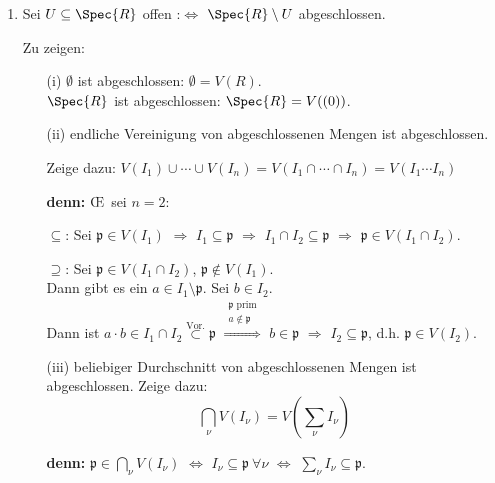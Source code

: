 \begin{Bew}
\begin{enumerate}
\item Sei $U \subseteq \Spec{R}$ offen :$\Leftrightarrow$ $\Spec{R} \setminus U$
abgeschlossen.

Zu zeigen:
\begin{enumerate}
\item[(i)] $\emptyset$ ist abgeschlossen: $\emptyset = V(R)$.\\
$\Spec{R}$ ist abgeschlossen: $\Spec{R} = V( (0) )$.

\item[(ii)] endliche Vereinigung von abgeschlossenen Mengen ist abgeschlossen.

Zeige dazu: $V(I_1) \cup \cdots \cup V(I_n) = V(I_1 \cap \cdots \cap I_n) = V(I_1 \cdots I_n)$

\textbf{denn:} \OE\ sei $n=2$:

\glqq$\subseteq$\grqq: Sei $\mathfrak{p} \in V(I_1)$ $\Rightarrow$ $I_1 \subseteq \mathfrak{p}$ $\Rightarrow$ $I_1 \cap I_2 \subseteq \mathfrak{p}$ $\Rightarrow$ $\mathfrak{p} \in V(I_1 \cap I_2)$.

\glqq$\supseteq$\grqq: Sei $\mathfrak{p} \in V(I_1 \cap I_2)$, $\mathfrak{p} \not\in V(I_1)$.\\
Dann gibt es ein $a \in I_1 \setminus \mathfrak{p}$. Sei $b \in I_2$.\\
Dann ist $a \cdot b \in I_1 \cap I_2 \overset{\text{Vor.}}{\subset} \mathfrak{p}$ $\overset{\substack{\mathfrak{p}\text{ prim} \\ a \notin \mathfrak{p}}}{\Rightarrow}$ $b \in \mathfrak{p}$ $\Rightarrow$ $I_2 \subseteq \mathfrak{p}$, d.h. $\mathfrak{p} \in V(I_2)$.

\item[(iii)] beliebiger Durchschnitt von abgeschlossenen Mengen ist abgeschlossen. Zeige dazu:
$$\bigcap_\nu V(I_\nu) = V\left(\sum_\nu I_\nu\right)$$

\textbf{denn:} $\mathfrak{p} \in \bigcap_\nu V(I_\nu)$ $\Leftrightarrow$ $I_\nu \subseteq \mathfrak{p}\ \forall \nu$ $\Leftrightarrow$ $\sum_\nu I_\nu \subseteq \mathfrak{p}$.

\end{enumerate}
\end{enumerate} 

\end{Bew}




